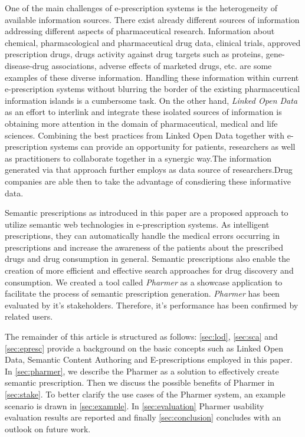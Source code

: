 \documentclass[10pt, conference, compsocconf]{IEEEtran}
\begin{document}
One of the main challenges of e-prescription systems is the heterogeneity of available information sources.
There exist already different sources of information addressing different aspects of pharmaceutical research.
Information about chemical, pharmacological and pharmaceutical drug data, clinical trials, approved prescription drugs, drugs activity against drug targets such as proteins, gene-disease-drug associations, adverse effects of marketed drugs, etc. are some examples of these diverse information.
Handling these information within current e-prescription systems without blurring the border of the existing pharmaceutical information islands is a cumbersome task.
On the other hand, \emph{Linked Open Data} as an effort to interlink and integrate these isolated sources of information is obtaining more attention in the domain of pharmaceutical, medical and life sciences.
Combining the best practices from Linked Open Data together with e-prescription systems can provide an opportunity for patients, researchers as well as practitioners to collaborate together in a synergic way.The information generated via that approach further employs as data source of researchers.Drug companies are able then to take the advantage of consdiering these informative data.

Semantic prescriptions as introduced in this paper are a proposed approach to utilize semantic web technologies in e-prescription systems.
As intelligent prescriptions, they can automatically handle the medical errors occurring in prescriptions and increase the awareness of the patients about the prescribed drugs and drug consumption in general.
Semantic prescriptions also enable the creation of more efficient and effective search approaches for drug discovery and consumption.
We created a tool called \emph{Pharmer} as a showcase application to facilitate the process of semantic prescription generation.
\emph{Pharmer} has been evaluated by it's stakeholders. Therefore, it's performance has been confirmed by related users.

The remainder of this article is structured as follows:
\autoref{sec:lod}, \autoref{sec:sca} and \autoref{sec:epresc} provide a background on the basic concepts such as Linked Open Data, Semantic Content Authoring and E-prescriptions employed in this paper.
In \autoref{sec:pharmer}, we describe the Pharmer as a solution to effectively create semantic prescription.
Then we discuss the possible benefits of Pharmer in \autoref{sec:stake}.
To better clarify the use cases of the Pharmer system, an example scenario is drawn in \autoref{sec:example}.
In \autoref{sec:evaluation} Pharmer usability evaluation results are reported and finally \autoref{sec:conclusion} concludes with an outlook on future work.
\end{document}
